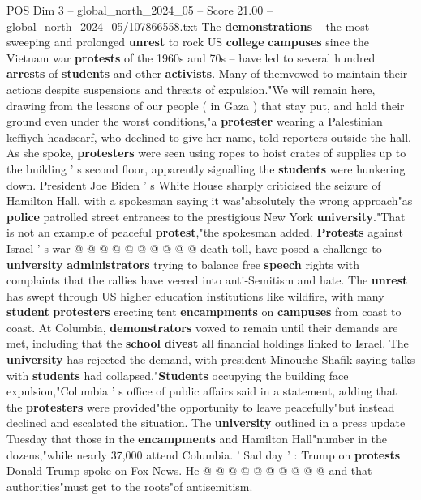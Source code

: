 \begin{textsample}{POS Dim 3 – global\_north\_2024\_05 – Score 21.00 – global\_north\_2024\_05/107866558.txt}  \label{ex:f3_pos_018}
The \textbf{demonstrations} -- the most sweeping and prolonged \textbf{unrest} to rock US \textbf{college} \textbf{campuses} since the Vietnam war \textbf{protests} of the 1960s and 70s -- have led to several hundred \textbf{arrests} of \textbf{students} and other \textbf{activists}.
Many of themvowed to maintain their actions despite suspensions and threats of expulsion."We will remain here, drawing from the lessons of our people ( in Gaza ) that stay put, and hold their ground even under the worst conditions,"a \textbf{protester} wearing a Palestinian keffiyeh headscarf, who declined to give her name, told reporters outside the hall.
As she spoke, \textbf{protesters} were seen using ropes to hoist crates of supplies up to the building ' s second floor, apparently signalling the \textbf{students} were hunkering down.
President Joe Biden ' s White House sharply criticised the seizure of Hamilton Hall, with a spokesman saying it was"absolutely the wrong approach"as \textbf{police} patrolled street entrances to the prestigious New York \textbf{university}."That is not an example of peaceful \textbf{protest},"the spokesman added. \textbf{Protests} against Israel ' s war @ @ @ @ @ @ @ @ @ @ death toll, have posed a challenge to \textbf{university} \textbf{administrators} trying to balance free \textbf{speech} rights with complaints that the rallies have veered into anti-Semitism and hate.
The \textbf{unrest} has swept through US higher education institutions like wildfire, with many \textbf{student} \textbf{protesters} erecting tent \textbf{encampments} on \textbf{campuses} from coast to coast.
At Columbia, \textbf{demonstrators} vowed to remain until their demands are met, including that the \textbf{school} \textbf{divest} all financial holdings linked to Israel.
The \textbf{university} has rejected the demand, with president Minouche Shafik saying talks with \textbf{students} had collapsed."\textbf{Students} occupying the building face expulsion,"Columbia ' s office of public affairs said in a statement, adding that the \textbf{protesters} were provided"the opportunity to leave peacefully"but instead declined and escalated the situation.
The \textbf{university} outlined in a press update Tuesday that those in the \textbf{encampments} and Hamilton Hall"number in the dozens,"while nearly 37,000 attend Columbia. ' Sad day ' : Trump on \textbf{protests} Donald Trump spoke on Fox News.
He @ @ @ @ @ @ @ @ @ @ and that authorities"must get to the roots"of antisemitism.

\end{textsample}
